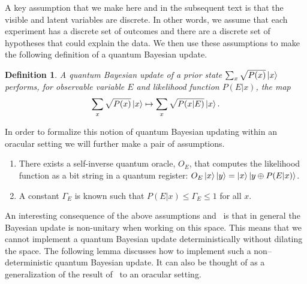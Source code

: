\documentclass[aps,amsmath,onecolumn,amssymb,notitlepage]{revtex4-1}
\newtheorem{definition}{Definition}
\begin{document}
 A key assumption that we make here and in the subsequent text is that the visible and latent variables are discrete.  In other words, we assume that each experiment has a discrete set of outcomes and there are a discrete set of hypotheses that could explain the data.  We then use these assumptions to make the following definition of a quantum Bayesian update.
\begin{definition}\label{def:qbayes}
A quantum Bayesian update of a prior state $\sum_x \sqrt{P(x)} \left|x\right\rangle$ performs, for observable variable $E$ and likelihood function $P(E|x)$, the map 
$$\sum_x \sqrt{P(x)} \left|x\right\rangle\mapsto  \sum_x \sqrt{P(x|E)} \left|x\right\rangle. $$
\end{definition}

In order to formalize this notion of quantum Bayesian updating within an oracular setting we will further make a pair of assumptions.
\begin{enumerate}
\item There exists a self-inverse quantum oracle, $O_E$, that computes the likelihood function as a bit string in a quantum register: $O_E\left|x\right\rangle\left|y\right\rangle = \left|x\right\rangle\left|y\oplus P(E|x)\right\rangle$.
\item A constant $\Gamma_E$ is known such that $P(E|x) \le \Gamma_E \le 1$ for all $x$.
\end{enumerate}


An interesting consequence of the above assumptions and~ is that in general the Bayesian update is non-unitary when working on this space.  This means that we cannot  implement a quantum Bayesian update deterministically without dilating the space.
The following lemma discusses how to implement such a non--deterministic quantum Bayesian update.  It can also be thought of as a generalization of the result of~\cite{LYC14} to an oracular setting.
\end{document}
